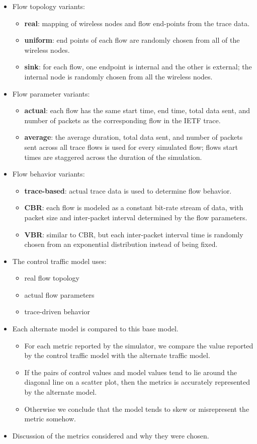 \documentclass{article}
\begin{document}
\begin{itemize}
\item Flow topology variants:
\begin{itemize}
\item \textbf{real}: mapping of wireless nodes and flow end-points from the trace data.
\item \textbf{uniform}: end points of each flow are randomly chosen from all of the wireless nodes.
\item \textbf{sink}: for each flow, one endpoint is internal and the other is external; the internal node is randomly chosen from all the wireless nodes.
\end{itemize}
\item  Flow parameter variants:
\begin{itemize}
\item \textbf{actual}: each flow has the same start time, end time, total data sent, and number of packets as the corresponding flow in the IETF trace.
\item \textbf{average}: the average duration, total data sent, and number of packets sent across all trace flows is used for every simulated flow; flows start times are staggered across the duration of the simulation.
\end{itemize}
\item Flow behavior variants:
\begin{itemize}
\item \textbf{trace-based}: actual trace data is used to determine flow behavior.
\item \textbf{CBR}: each flow is modeled as a constant bit-rate stream of data, with packet size and inter-packet interval determined by the flow parameters.
\item \textbf{VBR}: similar to CBR, but each inter-packet interval time is randomly chosen from an exponential distribution instead of being fixed.
\end{itemize}
\item The control traffic model uses:
\begin{itemize}
\item real flow topology
\item actual flow parameters
\item trace-driven behavior
\end{itemize}
\item Each alternate model is compared to this base model.
\begin{itemize}
\item For each metric reported by the simulator, we compare the value reported by the control traffic model with the alternate traffic model.
\item If the pairs of control values and model values tend to lie around the diagonal line on a scatter plot, then the metrics is accurately represented by the alternate model.
\item Otherwise we conclude that the model tends to skew or misrepresent the metric somehow.
\end{itemize}
\item Discussion of the metrics considered and why they were chosen.
\end{itemize}
\end{document}
